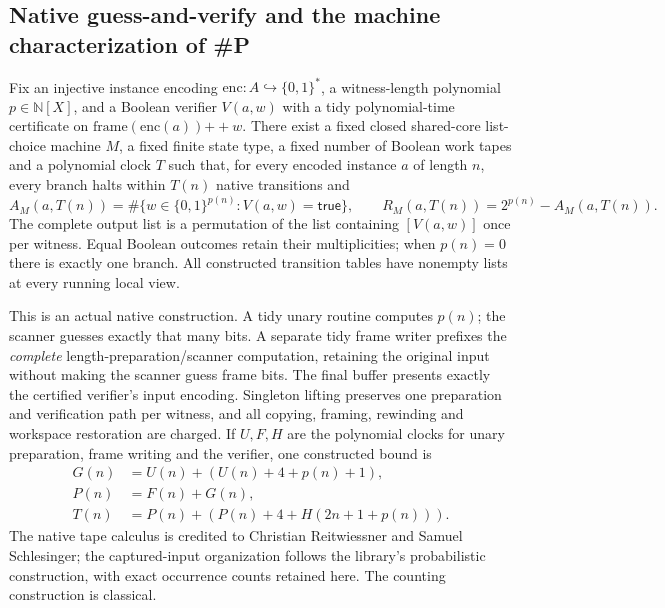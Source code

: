 \begin{result}
\subsection{Native guess-and-verify and the machine characterization of \#P}
Fix an injective instance encoding $\mathrm{enc}:A\hookrightarrow\{0,1\}^*$,
a witness-length polynomial $p\in\mathbb N[X]$, and a Boolean verifier $V(a,w)$
with a tidy polynomial-time certificate on
$\mathrm{frame}(\mathrm{enc}(a))\mathbin{+\!+}w$.
There exist a fixed closed shared-core list-choice machine $M$, a fixed finite
state type, a fixed number of Boolean work tapes and a polynomial clock $T$
such that, for every encoded instance $a$ of length $n$, every branch halts
within $T(n)$ native transitions and
\[
 A_M(a,T(n))=\#\{w\in\{0,1\}^{p(n)}:V(a,w)=\mathsf{true}\},
 \qquad
 R_M(a,T(n))=2^{p(n)}-A_M(a,T(n)).
\]
The complete output list is a permutation of the list containing
$[V(a,w)]$ once per witness. Equal Boolean outcomes retain their multiplicities;
when $p(n)=0$ there is exactly one branch. All constructed transition tables
have nonempty lists at every running local view.

This is an actual native construction. A tidy unary routine computes $p(n)$;
the scanner guesses exactly that many bits. A separate tidy frame writer
prefixes the \emph{complete} length-preparation/scanner computation, retaining
the original input without making the scanner guess frame bits. The final
buffer presents exactly the certified verifier's input encoding. Singleton
lifting preserves one preparation and verification path per witness, and all
copying, framing, rewinding and workspace restoration are charged. If $U,F,H$
are the polynomial clocks for unary preparation, frame writing and the verifier,
one constructed bound is
\[
\begin{aligned}
 G(n)&=U(n)+(U(n)+4+p(n)+1),\\
 P(n)&=F(n)+G(n),\\
 T(n)&=P(n)+(P(n)+4+H(2n+1+p(n))).
\end{aligned}
\]
The native tape calculus is credited to Christian Reitwiessner and Samuel
Schlesinger; the captured-input organization follows the library's probabilistic
construction, with exact occurrence counts retained here. The counting
construction is classical.\citep{Valiant1979,AroraBarak09}


\end{result}

